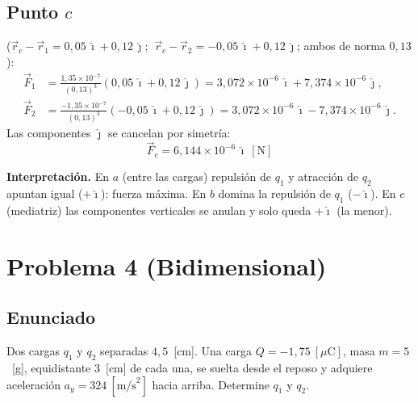 \documentclass[12pt,letterpaper]{article}
\begin{document}
\subsection*{Punto $c$} ($\vec r_c-\vec r_1=0{,}05\,\hat\imath+0{,}12\,\hat\jmath$; $\ \vec r_c-\vec r_2=-0{,}05\,\hat\imath+0{,}12\,\hat\jmath$; ambos de norma $0{,}13$):
\begin{align*}
\vec F_1 &= \frac{1{,}35\times10^{-7}}{(0{,}13)^3}(0{,}05\,\hat\imath+0{,}12\,\hat\jmath) = 3{,}072\times10^{-6}\,\hat\imath+7{,}374\times10^{-6}\,\hat\jmath,\\[2pt]
\vec F_2 &= \frac{-1{,}35\times10^{-7}}{(0{,}13)^3}(-0{,}05\,\hat\imath+0{,}12\,\hat\jmath) = 3{,}072\times10^{-6}\,\hat\imath-7{,}374\times10^{-6}\,\hat\jmath.
\end{align*}
Las componentes $\hat\jmath$ se cancelan por simetr\'ia:
\[
\boxed{\vec F_c = 6{,}144\times10^{-6}\,\hat\imath\ [\text{N}]}
\]

\noindent\textbf{Interpretaci\'on.} En $a$ (entre las cargas) repulsi\'on de $q_1$ y atracci\'on de $q_2$ apuntan igual ($+\hat\imath$): fuerza m\'axima. En $b$ domina la repulsi\'on de $q_1$ ($-\hat\imath$). En $c$ (mediatriz) las componentes verticales se anulan y solo queda $+\hat\imath$ (la menor).

\newpage
\section*{Problema 4 (Bidimensional)}

\subsection*{Enunciado}

Dos cargas $q_1$ y $q_2$ separadas $4{,}5$~[cm]. Una carga $Q = -1{,}75\ [\mu\text{C}]$, masa $m = 5$~[g], equidistante $3$~[cm] de cada una, se suelta desde el reposo y adquiere aceleraci\'on $a_y = 324\ [\text{m/s}^2]$ hacia arriba. Determine $q_1$ y $q_2$.

\medskip
\end{document}
